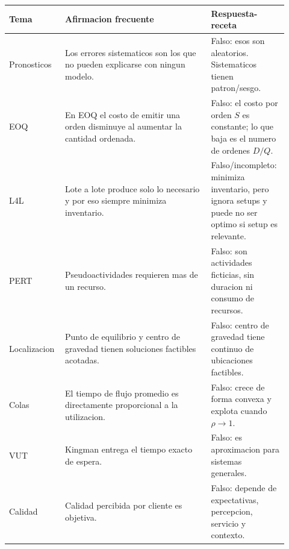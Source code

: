 \begin{longtable}{p{0.18\linewidth}p{0.50\linewidth}p{0.24\linewidth}}
\toprule
Tema & Afirmacion frecuente & Respuesta-receta \\
\midrule
\endhead
Pronosticos & Los errores sistematicos son los que no pueden explicarse con ningun modelo. & Falso: esos son aleatorios. Sistematicos tienen patron/sesgo. \\
EOQ & En EOQ el costo de emitir una orden disminuye al aumentar la cantidad ordenada. & Falso: el costo por orden $S$ es constante; lo que baja es el numero de ordenes $D/Q$. \\
L4L & Lote a lote produce solo lo necesario y por eso siempre minimiza inventario. & Falso/incompleto: minimiza inventario, pero ignora setups y puede no ser optimo si setup es relevante. \\
PERT & Pseudoactividades requieren mas de un recurso. & Falso: son actividades ficticias, sin duracion ni consumo de recursos. \\
Localizacion & Punto de equilibrio y centro de gravedad tienen soluciones factibles acotadas. & Falso: centro de gravedad tiene continuo de ubicaciones factibles. \\
Colas & El tiempo de flujo promedio es directamente proporcional a la utilizacion. & Falso: crece de forma convexa y explota cuando $\rho\to 1$. \\
VUT & Kingman entrega el tiempo exacto de espera. & Falso: es aproximacion para sistemas generales. \\
Calidad & Calidad percibida por cliente es objetiva. & Falso: depende de expectativas, percepcion, servicio y contexto. \\
\bottomrule
\end{longtable}
